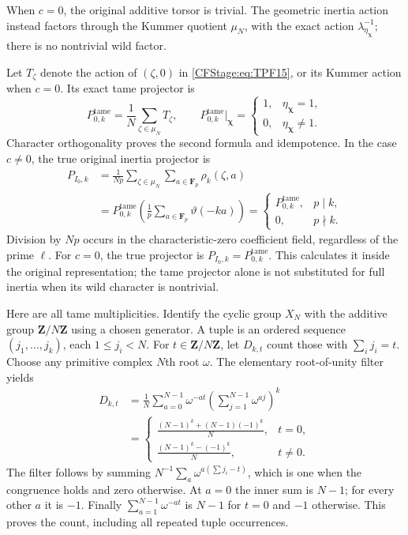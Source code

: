 When \(c=0\), the original additive torsor is trivial.
The geometric inertia action instead factors through
the Kummer quotient \(\mu_N\), with the exact action
\(\lambda_{\eta_{\boldsymbol\chi}}^{-1}\); there is no
nontrivial wild factor.

Let \(T_\zeta\) denote the action of \((\zeta,0)\) in
\eqref{CFStage:eq:TPF15}, or its Kummer action when \(c=0\).
Its exact tame projector is
\[
 P^{\mathrm{tame}}_{0,k}=\frac1N\sum_{\zeta\in\mu_N}T_\zeta,
 \qquad
 P^{\mathrm{tame}}_{0,k}\big|_{\boldsymbol\chi}
   =\begin{cases}
     1,&\eta_{\boldsymbol\chi}=1,\\
     0,&\eta_{\boldsymbol\chi}\ne1 .
    \end{cases}
 \tag{TPF.16}\label{CFStage:eq:TPF16}
\]
Character orthogonality proves the second formula and
idempotence. In the case \(c\ne0\), the true original
inertia projector is
\[
 \begin{split}
 P_{I_0,k}
 &=\frac1{Np}\sum_{\zeta\in\mu_N}\sum_{a\in\mathbf F_p}
                         \rho_k(\zeta,a)\\
 &=P^{\mathrm{tame}}_{0,k}
                \left(\frac1p\sum_{a\in\mathbf F_p}
                                      \vartheta(-ka)\right)
 =\begin{cases}
    P^{\mathrm{tame}}_{0,k},&p\mid k,\\
    0,&p\nmid k .
   \end{cases}
 \end{split}
 \tag{TPF.17}\label{CFStage:eq:TPF17}
\]
Division by \(Np\) occurs in the characteristic-zero
coefficient field, regardless of the prime \(\ell\).
For \(c=0\), the true projector is
\(P_{I_0,k}=P^{\mathrm{tame}}_{0,k}\).
This calculates it inside the original representation;
the tame projector alone is not substituted for full
inertia when its wild character is nontrivial.

Here are all tame multiplicities. Identify the cyclic
group \(X_N\) with the additive group \(\mathbf Z/N\mathbf Z\)
using a chosen generator. A tuple is an ordered sequence
\((j_1,\ldots,j_k)\), each \(1\le j_i<N\).
For \(t\in\mathbf Z/N\mathbf Z\), let \(D_{k,t}\) count
those with \(\sum_i j_i=t\). Choose any primitive complex
\(N\)th root \(\omega\). The elementary root-of-unity
filter yields
\[
 \begin{split}
 D_{k,t}
 &=\frac1N\sum_{a=0}^{N-1}\omega^{-at}
                  \left(\sum_{j=1}^{N-1}\omega^{aj}\right)^k\\
 &=\begin{cases}
 \displaystyle\frac{(N-1)^k+(N-1)(-1)^k}{N},&t=0,\\[4pt]
 \displaystyle\frac{(N-1)^k-(-1)^k}{N},&t\ne0 .
 \end{cases}
 \end{split}
 \tag{TPF.18}\label{CFStage:eq:TPF18}
\]
The filter follows by summing
\(N^{-1}\sum_a\omega^{a(\sum j_i-t)}\), which is one
when the congruence holds and zero otherwise.
At \(a=0\) the inner sum is \(N-1\); for every other
\(a\) it is \(-1\). Finally
\(\sum_{a=1}^{N-1}\omega^{-at}\) is \(N-1\) for \(t=0\)
and \(-1\) otherwise. This proves the count, including
all repeated tuple occurrences.

